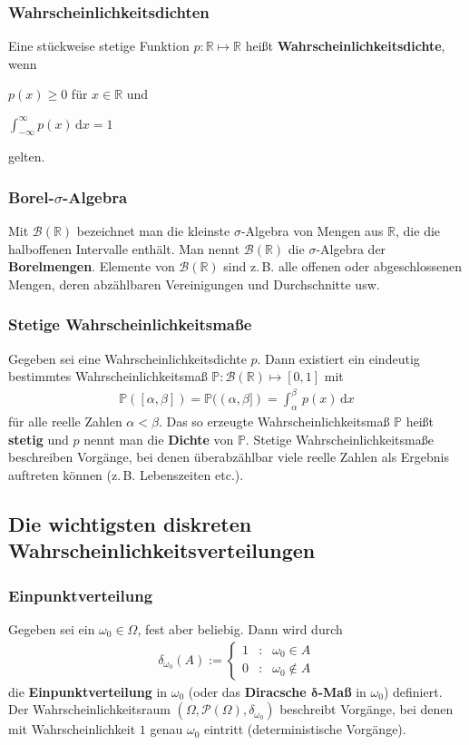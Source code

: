 \documentclass[ngerman,draft,parskip=half,twoside]{scrartcl}
\newcommand*{\R}{\mathbb{R}}      %
\newcommand*{\BorelM}{\mathcal{B}}  %
\newcommand*{\PotM}{\mathcal{P}}    %
\newcommand*{\WKM}{\mathbb{P}}      %
\begin{document}
\subsubsection{Wahrscheinlichkeitsdichten}
Eine stückweise stetige Funktion $p\colon\R\mapsto\R$ heißt
\textbf{Wahrscheinlichkeitsdichte}, wenn
\begin{eigenschaften}
 \item $p(x)\ge 0$ für $x\in\R$ und
 \item $\int_{-\infty}^\infty p(x)\,\mathrm d x=1$
\end{eigenschaften}
gelten.
\subsubsection{Borel-$\sigma$-Algebra}
Mit $\BorelM(\R)$ bezeichnet man die kleinste $\sigma$-Algebra von Mengen aus $\R$, die
die halboffenen Intervalle enthält. Man nennt $\BorelM(\R)$ die $\sigma$-Algebra der
\textbf{Borelmengen}. Elemente von $\BorelM(\R)$ sind z.\,B. alle offenen oder abgeschlossenen Mengen,
deren abzählbaren Vereinigungen und Durchschnitte usw.
\subsubsection{Stetige Wahrscheinlichkeitsmaße}
Gegeben sei eine Wahrscheinlichkeitsdichte $p$. Dann existiert ein eindeutig bestimmtes
Wahrscheinlichkeitsmaß $\WKM \colon\BorelM(\R)\mapsto [0,1]$ mit
\begin{gather*}
  \WKM([\alpha,\beta])=\WKM((\alpha,\beta])=\int_\alpha^\beta\,p(x)\,\mathrm dx
\end{gather*}
für alle reelle Zahlen $\alpha<\beta$. Das so erzeugte Wahrscheinlichkeitsmaß $\WKM$ heißt \textbf{stetig}
und $p$ nennt man die \textbf{Dichte} von $\WKM$. Stetige Wahrscheinlichkeitsmaße beschreiben Vorgänge,
bei denen überabzählbar viele reelle Zahlen als Ergebnis auftreten können (z.\,B. Lebenszeiten etc.).
\subsection{Die wichtigsten diskreten Wahrscheinlichkeitsverteilungen}

\subsubsection{Einpunktverteilung}
Gegeben sei ein $\omega_0\in \Omega$, fest aber beliebig. Dann wird
durch
\begin{gather*}
  \delta_{\omega_0}(A):=\left\{
     \begin{array}{rcl}
       1 &\colon& \omega_0\in A\\
       0 &\colon& \omega_0\notin A
     \end{array}
     \right.
\end{gather*}
die \textbf{Einpunktverteilung} in $\omega_0$ (oder das \textbf{Diracsche $\mathbf \delta$-Maß} in
$\omega_0$) definiert. Der Wahrscheinlichkeitsraum $(\Omega,\PotM(\Omega),\delta_{\omega_0})$
beschreibt Vorgänge, bei denen mit Wahrscheinlichkeit $1$ genau $\omega_0$ eintritt (deterministische
Vorgänge).
\end{document}
